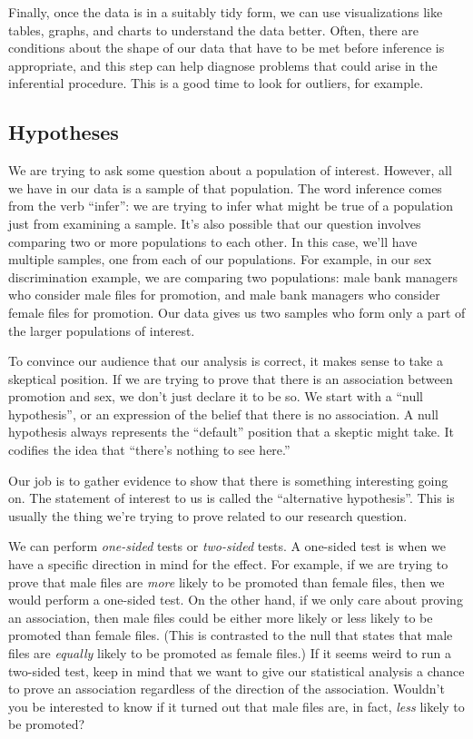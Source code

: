 \documentclass[
]{book}
\begin{document}
Finally, once the data is in a suitably tidy form, we can use visualizations like tables, graphs, and charts to understand the data better. Often, there are conditions about the shape of our data that have to be met before inference is appropriate, and this step can help diagnose problems that could arise in the inferential procedure. This is a good time to look for outliers, for example.

\hypertarget{hypothesis1-hypotheses}{%
\subsection{Hypotheses}\label{hypothesis1-hypotheses}}

We are trying to ask some question about a population of interest. However, all we have in our data is a sample of that population. The word inference comes from the verb ``infer'': we are trying to infer what might be true of a population just from examining a sample. It's also possible that our question involves comparing two or more populations to each other. In this case, we'll have multiple samples, one from each of our populations. For example, in our sex discrimination example, we are comparing two populations: male bank managers who consider male files for promotion, and male bank managers who consider female files for promotion. Our data gives us two samples who form only a part of the larger populations of interest.

To convince our audience that our analysis is correct, it makes sense to take a skeptical position. If we are trying to prove that there is an association between promotion and sex, we don't just declare it to be so. We start with a ``null hypothesis'', or an expression of the belief that there is no association. A null hypothesis always represents the ``default'' position that a skeptic might take. It codifies the idea that ``there's nothing to see here.''

Our job is to gather evidence to show that there is something interesting going on. The statement of interest to us is called the ``alternative hypothesis''. This is usually the thing we're trying to prove related to our research question.

We can perform \emph{one-sided} tests or \emph{two-sided} tests. A one-sided test is when we have a specific direction in mind for the effect. For example, if we are trying to prove that male files are \emph{more} likely to be promoted than female files, then we would perform a one-sided test. On the other hand, if we only care about proving an association, then male files could be either more likely or less likely to be promoted than female files. (This is contrasted to the null that states that male files are \emph{equally} likely to be promoted as female files.) If it seems weird to run a two-sided test, keep in mind that we want to give our statistical analysis a chance to prove an association regardless of the direction of the association. Wouldn't you be interested to know if it turned out that male files are, in fact, \emph{less} likely to be promoted?
\end{document}
